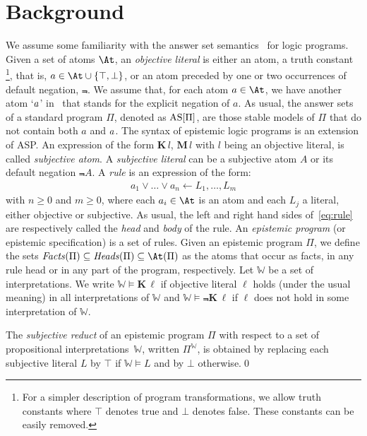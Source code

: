 \documentclass{new_tlp}
\def\K{\mathbf{K}\, }
\def\M{\mathbf{M}\, }
\let\sneg\relax
\newcommand{\sneg}{\ensuremath{\text{-}}}
\def\AS{\text{\rm AS}}
\newcommand\wv{\mathbb{W}}
\def\bL{\K}
\def\Facts{\mathit{Facts}}
\def\Heads{\mathit{Heads}}
\begin{document}
\section{Background}
\label{sec:background}
We assume some familiarity with the answer set semantics~\cite{GL91} for logic programs.
%
Given a set of atoms $\At$, an \emph{objective literal} is either an atom, a truth constant%
\footnote{For a simpler description of program transformations, we allow truth constants where $\top$ denotes true and $\bot$ denotes false.
  These constants can be easily removed.},
that is, \mbox{$a \in \At \cup \{\top,\bot\}$}, or an atom preceded by one or two occurrences of default negation, $\Not$.
%
We assume that, for each atom $a \in \At$, we have another atom `$\sneg a$' in \At\ that stands for the explicit negation of $a$.
%
As usual, the answer sets of a standard program $\Pi$, denoted as $\AS[\Pi]$, are those stable models of $\Pi$ that do not contain both $a$ and $\sneg a$.
%
The syntax of epistemic logic programs is an extension of ASP.
%
An expression of the form $\K l$, $\M l$ with $l$ being an objective literal, is called \emph{subjective atom}.
%
A \emph{subjective literal} can be a subjective atom $A$ or its default negation $\Not A$.
%
A \emph{rule} is an expression of the form:
\begin{gather}
a_1 \vee \dots \vee a_n \leftarrow L_1, \dots, L_m
	\label{eq:rule}
\end{gather}
with $n\geq 0$ and $m\geq 0$, where each $a_i \in \At$ is an atom and each $L_j$ a literal, either objective or subjective.
%
As usual, the left and right hand sides of~\eqref{eq:rule} are respectively called the \emph{head} and \emph{body} of the rule.
%
An \emph{epistemic program} (or epistemic specification) is a set of rules.
%
Given an epistemic program $\Pi$, we define the sets $\Facts(\Pi) \subseteq \Heads(\Pi) \subseteq \At(\Pi)$ as the atoms that occur as facts, in any rule head or in any part of the program, respectively.
Let $\wv$ be a set of interpretations.
We write $\wv \models \bL \ell$ if objective literal $\ell$ holds (under the usual meaning) in all interpretations of $\wv$ and $\wv \models \Not \bL \ell$ if $\ell$ does not hold in some interpretation of $\wv$.

\begin{definition}
The \emph{subjective reduct} of an epistemic program $\Pi$ with respect to a set of propositional interpretations~$\wv$, written $\Pi^\wv$, is
obtained by replacing each subjective literal $L$ by $\top$ if $\wv \models L$ and by $\bot$ otherwise.\qed
\end{definition}
\end{document}
